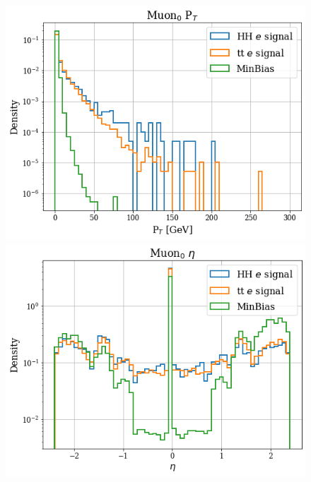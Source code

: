\documentclass[../main.tex]{subfiles}
\begin{document}
\begin{figure}[!ht]
  \begin{minipage}[b]{0.33\linewidth}
    \centering
    \includegraphics[width=1\linewidth]{Chapters/Plots/Hist_1ele_muon0_Pt.png}
  \end{minipage}%
  \begin{minipage}[b]{0.33\linewidth}
    \centering
    \includegraphics[width=1\linewidth]{Chapters/Plots/Hist_1ele_muon0_Eta.png}
  \end{minipage} %
  \begin{minipage}[b]{0.33\linewidth}

\end{minipage}
\end{figure}
\end{document}
